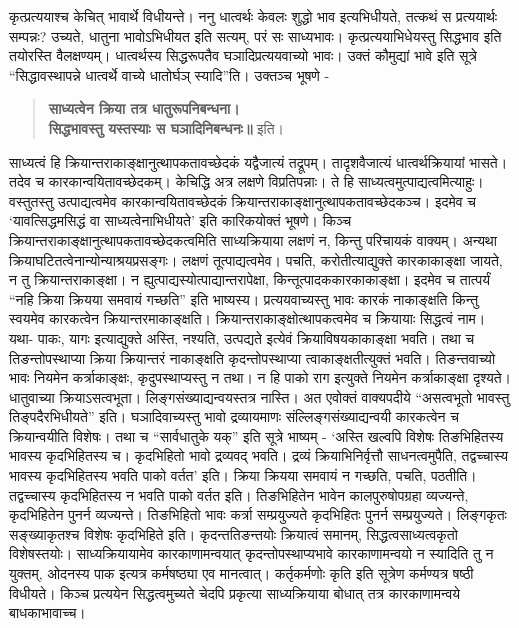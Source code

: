 {कृत्प्रत्ययाश्च केचित् भावार्थे विधीयन्ते। ननु धात्वर्थः केवलः शुद्धो भाव इत्यभिधीयते, तत्कथं स प्रत्ययार्थः सम्पन्नः? उच्यते, धातुना भावोऽभिधीयत इति सत्यम्, परं सः साध्यभावः। कृत्प्रत्ययाभिधेयस्तु सिद्धभाव इति तयोरस्ति वैलक्षण्यम्। धात्वर्थस्य सिद्धरूपतैव घञादिप्रत्ययवाच्यो भावः। उक्तं कौमुद्यां भावे इति सूत्रे “सिद्धावस्थापन्ने धात्वर्थे वाच्ये धातोर्घञ् स्यादि”ति। उक्तञ्च भूषणे -
\begin{verse}
\textbf{साध्यत्वेन क्रिया तत्र धातुरूपनिबन्धना।}\\
\textbf{सिद्धभावस्तु यस्तस्याः स घञादिनिबन्धनः॥} इति।
\end{verse}
साध्यत्वं हि क्रियान्तराकाङ्क्षानुत्थापकतावच्छेदकं यद्वैजात्यं तद्रूपम्।     तादृशवैजात्यं धात्वर्थक्रियायां भासते। तदेव च कारकान्वयितावच्छेदकम्। केचिद्धि अत्र लक्षणे विप्रतिपन्नाः। ते हि साध्यत्वमुत्पाद्यत्वमित्याहुः। वस्तुतस्तु उत्पाद्यत्वमेव कारकान्वयितावच्छेदकं क्रियान्तराकाङ्क्षानुत्थापकतावच्छेदकञ्च। इदमेव च ‘यावत्सिद्धमसिद्धं वा साध्यत्वेनाभिधीयते’ इति कारिकयोक्तं भूषणे। किञ्च क्रियान्तराकाङ्क्षानुत्थापकतावच्छेदकत्वमिति साध्यक्रियाया लक्षणं न, किन्तु परिचायकं वाक्यम्। अन्यथा क्रियाघटितत्वेनान्योन्याश्रयप्रसङ्गः। लक्षणं तूत्पाद्यत्वमेव। पचति, करोतीत्याद्युक्ते कारकाकाङ्क्षा जायते, न तु क्रियान्तराकाङ्क्षा। न ह्युत्पाद्यस्योत्पाद्यान्तरापेक्षा, किन्तूत्पादककारकाकाङ्क्षा। इदमेव च तात्पर्यं “नहि क्रिया क्रियया समवायं गच्छति” इति भाष्यस्य। प्रत्ययवाच्यस्तु भावः कारकं नाकाङ्क्षति किन्तु स्वयमेव कारकत्वेन क्रियान्तरमाकाङ्क्षति। क्रियान्तराकाङ्क्षोत्थापकत्वमेव च क्रियायाः सिद्धत्वं नाम। यथा- पाकः, यागः इत्याद्युक्ते अस्ति, नश्यति, उत्पद्यते इत्येवं क्रियाविषयकाकाङ्क्षा भवति। तथा च तिङन्तोपस्थाप्या क्रिया क्रियान्तरं नाकाङ्क्षति कृदन्तोपस्थाप्या त्वाकाङ्क्षतीत्युक्तं भवति। तिङन्तवाच्यो भावः नियमेन कर्त्राकाङ्क्षः, कृदुपस्थाप्यस्तु न तथा। न हि पाको राग इत्युक्ते नियमेन कर्त्राकाङ्क्षा दृश्यते। धातुवाच्या क्रियाऽसत्वभूता। लिङ्गसंख्याद्यन्वयस्तत्र नास्ति। अत एवोक्तं वाक्यपदीये “असत्वभूतो भावस्तु तिङ्पदैरभिधीयते” इति। घञादिवाच्यस्तु भावो द्रव्यायमाणः संल्लिङ्गसंख्याद्यन्वयी कारकत्वेन च क्रियान्वयीति विशेषः। तथा च “सार्वधातुके यक्” इति सूत्रे भाष्यम् - ‘अस्ति खल्वपि विशेषः तिङभिहितस्य भावस्य कृदभिहितस्य च। कृदभिहितो भावो द्रव्यवद् भवति। द्रव्यं क्रियाभिनिर्वृत्तौ साधनत्वमुपैति, तद्वच्चास्य भावस्य कृदभिहितस्य भवति पाको वर्तत’ इति। क्रिया क्रियया समवायं न गच्छति, पचति, पठतीति। तद्वच्चास्य कृदभिहितस्य न भवति पाको वर्तत इति। तिङभिहितेन भावेन कालपुरुषोपग्रहा व्यज्यन्ते, कृदभिहितेन पुनर्न व्यज्यन्ते। तिङभिहितो भावः कर्त्रा सम्प्रयुज्यते कृदभिहितः पुनर्न सम्प्रयुज्यते। लिङ्गकृतः सङ्ख्याकृतश्च विशेषः कृदभिहिते इति। कृदन्ततिङन्तयोः क्रियात्वं समानम्, सिद्धत्वसाध्यत्वकृतो विशेषस्तयोः। साध्यक्रियायामेव कारकाणामन्वयात् कृदन्तोपस्थाप्यभावे कारकाणामन्वयो न स्यादिति तु न युक्तम्, ओदनस्य पाक इत्यत्र कर्मषष्ठ्या एव मानत्वात्। कर्तृकर्मणोः कृति इति सूत्रेण कर्मण्यत्र षष्ठी विधीयते। किञ्च प्रत्ययेन सिद्धत्वमुच्यते चेदपि प्रकृत्या साध्यक्रियाया बोधात् तत्र कारकाणामन्वये बाधकाभावाच्च।

}
